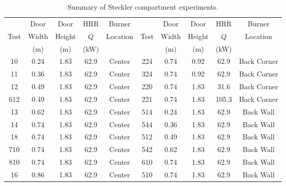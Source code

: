 \begin{table}[h!]
\centering
\caption[Summary of Steckler compartment experiments]{Summary of Steckler compartment experiments.}
\begin{tabular}{|c|c|c|c|c||c|c|c|c|c|}
\hline
        & Door      & Door          &  HRR       & Burner       &       & Door      & Door        &  HRR         & Burner        \\
Test    & Width     & Height        & $\dot{Q}$  & Location     & Test  & Width     & Height      & $\dot{Q}$    & Location      \\
        & (m)       & (m)           & (kW)       &              &       & (m)       &  (m)        & (kW)         &                \\ \hline \hline
10      & 0.24      & 1.83          &  62.9      & Center       & 224   & 0.74      & 0.92        &  62.9         & Back Corner         \\ \hline
11      & 0.36      & 1.83          &  62.9      & Center       & 324   & 0.74      & 0.92        &  62.9         & Back Corner         \\ \hline
12      & 0.49      & 1.83          &  62.9      & Center       & 220   & 0.74      & 1.83        &  31.6         & Back Corner         \\ \hline
612     & 0.49      & 1.83          &  62.9      & Center       & 221   & 0.74      & 1.83        &  105.3        & Back Corner         \\ \hline
13      & 0.62      & 1.83          &  62.9      & Center       & 514   & 0.24      & 1.83        &  62.9         & Back Wall           \\ \hline
14      & 0.74      & 1.83          &  62.9      & Center       & 544   & 0.36      & 1.83        &  62.9         & Back Wall           \\ \hline
18      & 0.74      & 1.83          &  62.9      & Center       & 512   & 0.49      & 1.83        &  62.9         & Back Wall           \\ \hline
710     & 0.74      & 1.83          &  62.9      & Center       & 542   & 0.62      & 1.83        &  62.9         & Back Wall           \\ \hline
810     & 0.74      & 1.83          &  62.9      & Center       & 610   & 0.74      & 1.83        &  62.9         & Back Wall           \\ \hline
16      & 0.86      & 1.83          &  62.9      & Center       & 510   & 0.74      & 1.83        &  62.9         & Back Wall           \\ \hline

\end{tabular}
\end{table}
